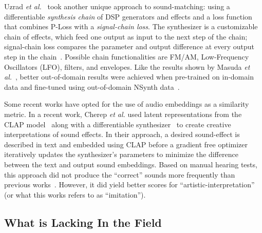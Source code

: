 Uzrad \textit{et al.}~\cite{uzrad2024diffmoog} took another unique approach to sound-matching: using a differentiable \textit{synthesis chain} of DSP generators and effects and a loss function that combines P-Loss with a \textit{signal-chain loss}. The synthesizer is a customizable chain of effects, which feed one output as input to the next step of the chain; signal-chain loss compares the parameter and output difference at every output step in the chain~\cite{uzrad2024diffmoog}. Possible chain functionalities are FM/AM, Low-Frequency Oscillators (\gls{LFO}), filters, and envelopes. Like the results shown by Masuda \textit{et al.}~\cite{masuda2021soundmatch}, better out-of-domain results were achieved when pre-trained on in-domain data and fine-tuned using out-of-domain NSynth data~\cite{engel2017neural}.


Some recent works have opted for the use of audio embeddings as a similarity metric. In a recent work, Cherep \textit{et al.} used latent representations from the CLAP model~\cite{wu2023large} along with a differentiable synthesizer~\cite{synthhaxcherep2023} to create creative interpretations of sound effects. In their approach, a desired sound-effect is described in text and embedded using CLAP before a gradient free optimizer~\cite{evosax2022github} iteratively updates the synthesizer's parameters to minimize the difference between the text and output sound embeddings. Based on manual hearing tests, this approach did not produce the ``correct'' sounds more frequently than previous works~\cite{kreuk2022audiogen}. However, it did yield better scores for ``artistic-interpretation'' (or what this works refers to as ``imitation'').


\subsection{What is Lacking In the Field}
\label{sec:lacking}


